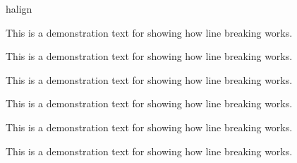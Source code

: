 \begin{docTcbKeys}[
    doc parameter   = {=\meta{alignment}},
    doc description = {no default, initially \texttt{justify}},
    doc new         = 2015-05-07,
  ]
\begin{exdispExample}{halign}

\begin{tcolorbox}[adjusted title=flush center,halign=flush center]
This is a demonstration text for showing how line breaking works.
\end{tcolorbox}
\begin{tcolorbox}[adjusted title=flush left,halign=flush left]
This is a demonstration text for showing how line breaking works.
\end{tcolorbox}
\begin{tcolorbox}[adjusted title=flush right,halign=flush right]
This is a demonstration text for showing how line breaking works.
\end{tcolorbox}

\begin{tcolorbox}[adjusted title=center,halign=center]
This is a demonstration text for showing how line breaking works.
\end{tcolorbox}
\begin{tcolorbox}[adjusted title=left,halign=left]
This is a demonstration text for showing how line breaking works.
\end{tcolorbox}
\begin{tcolorbox}[adjusted title=right,halign upper=right]
This is a demonstration text for showing how line breaking works.
\end{tcolorbox}
\end{exdispExample}

\end{docTcbKeys}

\clearpage

